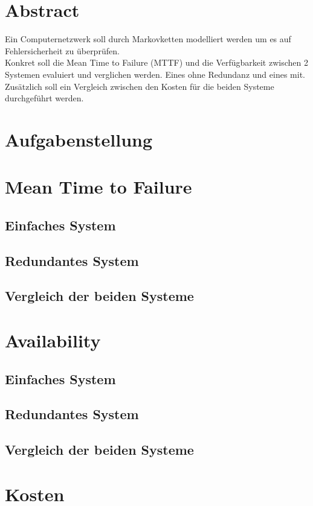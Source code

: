 \documentclass[10pt,a4paper]{article}
\begin{document}


\newpage
\section{Abstract}
Ein Computernetzwerk soll durch Markovketten modelliert werden um es auf Fehlersicherheit zu überprüfen.
\\ 
Konkret soll die Mean Time to Failure (MTTF) und die Verfügbarkeit zwischen 2 Systemen evaluiert und verglichen werden. Eines ohne Redundanz und eines mit.
Zusätzlich soll ein Vergleich zwischen den Kosten für die beiden Systeme durchgeführt werden.
\section{Aufgabenstellung}
 
\section{Mean Time to Failure}
\subsection{Einfaches System}
\subsection{Redundantes System}
\subsection{Vergleich der beiden Systeme}
\section{Availability}
\subsection{Einfaches System}
\subsection{Redundantes System}
\subsection{Vergleich der beiden Systeme}
\section{Kosten}
\end{document}
